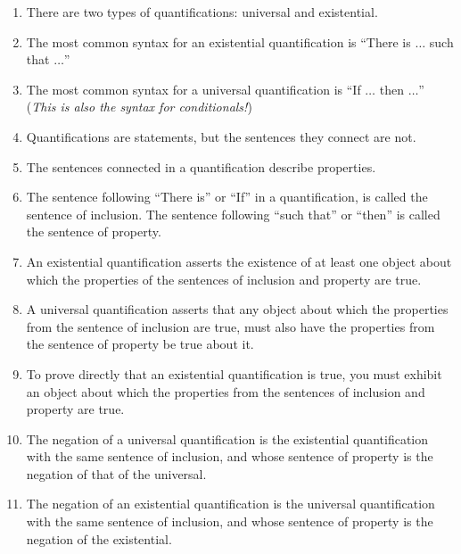 \documentclass{article}
\begin{document}
\begin{enumerate}[1.]

  \item There are two types of quantifications: universal and existential.

  \item The most common syntax for an existential quantification is ``There is $\ldots$ such that $\ldots$''

  \item The most common syntax for a universal quantification is ``If $\ldots$ then $\ldots$'' (\emph{This is also the syntax for conditionals!})

  \item Quantifications are statements, but the sentences they connect are not.

  \item The sentences connected in a quantification describe properties.

  \item The sentence following ``There is'' or ``If'' in a quantification, is called the sentence of inclusion. The sentence following ``such that'' or ``then'' is called the sentence of property.

  \item An existential quantification asserts the existence of at least one object about which the properties of the sentences of inclusion and property are true.

  \item A universal quantification asserts that any object about which the properties from the sentence of inclusion are true, must also have the properties from the sentence of property be true about it.

  \item To prove directly that an existential quantification is true, you must exhibit an object about which the properties from the sentences of inclusion and property are true.

  \item The negation of a universal quantification is the existential quantification with the same sentence of inclusion, and whose sentence of property is the negation of that of the universal.

  \item The negation of an existential quantification is the universal quantification with the same sentence of inclusion, and whose sentence of property is the negation of the existential.

\end{enumerate}
\end{document}
